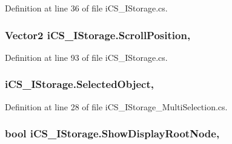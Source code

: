 Definition at line 36 of file i\+C\+S\+\_\+\+I\+Storage.\+cs.

\hypertarget{classi_c_s___i_storage_aeb23aad3dd43abe6c8f40a69a6daf05d}{
\subsubsection[{Scroll\+Position}]{\setlength{\rightskip}{0pt plus 5cm}Vector2 i\+C\+S\+\_\+\+I\+Storage.\+Scroll\+Position\hspace{0.3cm}{\ttfamily [get]}, {\ttfamily [set]}}}\label{classi_c_s___i_storage_aeb23aad3dd43abe6c8f40a69a6daf05d}


Definition at line 93 of file i\+C\+S\+\_\+\+I\+Storage.\+cs.

\hypertarget{classi_c_s___i_storage_a7a4f82d3bc11c222c204f5dcbe50bc7e}{
\subsubsection[{Selected\+Object}]{ i\+C\+S\+\_\+\+I\+Storage.\+Selected\+Object\hspace{0.3cm}{\ttfamily [get]}, {\ttfamily [set]}}}\label{classi_c_s___i_storage_a7a4f82d3bc11c222c204f5dcbe50bc7e}


Definition at line 28 of file i\+C\+S\+\_\+\+I\+Storage\+\_\+\+Multi\+Selection.\+cs.

\hypertarget{classi_c_s___i_storage_a94ed8359523d65e59accda52e3d6f8c1}{
\subsubsection[{Show\+Display\+Root\+Node}]{\setlength{\rightskip}{0pt plus 5cm}bool i\+C\+S\+\_\+\+I\+Storage.\+Show\+Display\+Root\+Node\hspace{0.3cm}{\ttfamily [get]}, {\ttfamily [set]}}}\label{classi_c_s___i_storage_a94ed8359523d65e59accda52e3d6f8c1}


